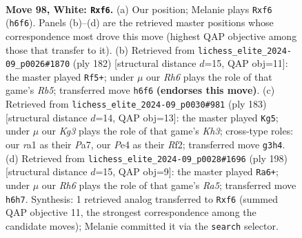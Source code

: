\documentclass[11pt]{article}
\begin{document}
\clearpage

\begin{figure}[p]\centering
\begin{subfigure}{0.46\textwidth}\centering
\resizebox{\linewidth}{!}{%
\newchessgame
\chessboard[
  setfen={8/3k4/4pp1R/8/1R2P3/5PK1/8/r7 w - - 8 98},
  showmover=false,
  pgfstyle=straightmove, color=movearrow, markmove={h6-f6}
]}
\caption{}
\end{subfigure}\hfill
\begin{subfigure}{0.46\textwidth}\centering
\resizebox{\linewidth}{!}{%
\newchessgame
\chessboard[
  setfen={8/8/5k2/1R4p1/6P1/5PK1/8/r7 w - - 90 92},
  showmover=false,
  pgfstyle=straightmove, color=movearrow, markmove={b5-f5}
]}
\caption{}
\end{subfigure}
\\[4pt]
\begin{subfigure}{0.46\textwidth}\centering
\resizebox{\linewidth}{!}{%
\newchessgame
\chessboard[
  setfen={8/p3P3/4K2k/7p/8/8/5r1p/7R b - - 7 92},
  showmover=false,
  pgfstyle=straightmove, color=movearrow, markmove={h6-g5}
]}
\caption{}
\end{subfigure}\hfill
\begin{subfigure}{0.46\textwidth}\centering
\resizebox{\linewidth}{!}{%
\newchessgame
\chessboard[
  setfen={8/8/7k/R6p/7P/6P1/6K1/1r6 w - - 76 100},
  showmover=false,
  pgfstyle=straightmove, color=movearrow, markmove={a5-a6}
]}
\caption{}
\end{subfigure}
\caption{\textbf{Move 98, White: \texttt{Rxf6}.} (a) Our position; Melanie plays \texttt{Rxf6} (\texttt{h6f6}). Panels (b)--(d) are the retrieved master positions whose correspondence most drove this move (highest QAP objective among those that transfer to it). (b) Retrieved from \texttt{lichess\_elite\_2024-09\_p0026\#1870} (ply 182) [structural distance $d$=15, QAP obj=11]: the master played \texttt{Rf5+}; under $\mu$ our \emph{Rh6} plays the role of that game's \emph{Rb5}; transferred move \texttt{h6f6} \textbf{(endorses this move)}. (c) Retrieved from \texttt{lichess\_elite\_2024-09\_p0030\#981} (ply 183) [structural distance $d$=14, QAP obj=13]: the master played \texttt{Kg5}; under $\mu$ our \emph{Kg3} plays the role of that game's \emph{Kh3}; cross-type roles: our \emph{r}a1 as their \emph{P}a7, our \emph{P}e4 as their \emph{R}f2; transferred move \texttt{g3h4}. (d) Retrieved from \texttt{lichess\_elite\_2024-09\_p0028\#1696} (ply 198) [structural distance $d$=15, QAP obj=9]: the master played \texttt{Ra6+}; under $\mu$ our \emph{Rh6} plays the role of that game's \emph{Ra5}; transferred move \texttt{h6h7}. Synthesis: 1 retrieved analog transferred to \texttt{Rxf6} (summed QAP objective 11, the strongest correspondence among the candidate moves); Melanie committed it via the \texttt{search} selector.}
\label{fig:thought-m194}
\end{figure}
\end{document}
